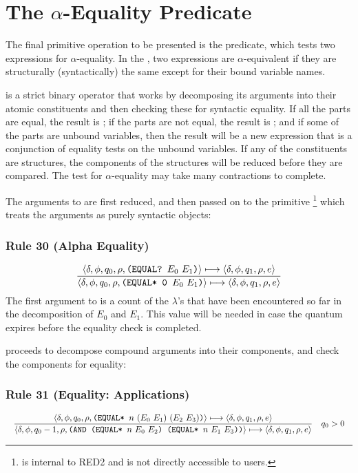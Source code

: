 \section{The \(\alpha\)-Equality Predicate}

The final primitive operation to be presented is the  predicate,
which tests two expressions for \(\alpha\)-equality. In the \lambdacalculus, two
expressions are \(\alpha\)-equivalent if they are structurally (syntactically)
the same except for their bound variable names.

 is a strict binary operator that works by decomposing its
arguments into their atomic constituents and then checking these for syntactic
equality. If all the parts are equal, the result is ; if the parts
are not equal, the result is ; and if some of the parts are unbound
variables, then the result will be a new expression that is a conjunction of
equality tests on the unbound variables. If any of the constituents are
structures, the components of the structures will be reduced before they are
compared. The test for \(\alpha\)-equality may take many contractions to
complete.

The arguments to  are first reduced, and then passed on to the
primitive \footnote{ is internal to RED2 and is not
directly accessible to users.} which treats the arguments as purely syntactic
objects:

\subsubsection*{Rule 30 (Alpha Equality)}
\[
\frac{
\langle \delta,\phi,q_0,\rho,\texttt{(EQUAL? }E_0\ E_1\texttt{)}\rangle\longmapsto
\langle \delta,\phi,q_1,\rho,e\rangle
}{
\langle \delta,\phi,q_0,\rho,\texttt{(EQUAL* 0 }E_0\ E_1\texttt{)}\rangle\longmapsto
\langle \delta,\phi,q_1,\rho,e\rangle
}
\]
The first argument to  is a count of the \(\lambda\)'s that have
been encountered so far in the decomposition of \(E_0\) and \(E_1\). This value
will be needed in case the quantum expires before the equality check is
completed.

 proceeds to decompose compound arguments into their components,
and check the components for equality:

\subsubsection*{Rule 31 (Equality: Applications)}
\[
\resizebox{\textwidth}{!}{$\displaystyle
\frac{
\cfg{\delta}{\phi}{q_0}{\rho}{\THOR{(EQUAL* }n\ (E_0\ E_1)\ (E_2\ E_3)\THOR{)}}\redsto
\cfg{\delta}{\phi}{q_1}{\rho}{e}
}{
\cfg{\delta}{\phi}{q_0-1}{\rho}{\THOR{(AND (EQUAL* }n\ E_0\ E_2\THOR{) (EQUAL* }n\ E_1\ E_3\THOR{))}}\redsto
\cfg{\delta}{\phi}{q_1}{\rho}{e}
}
\quad q_0>0
$}
\]

